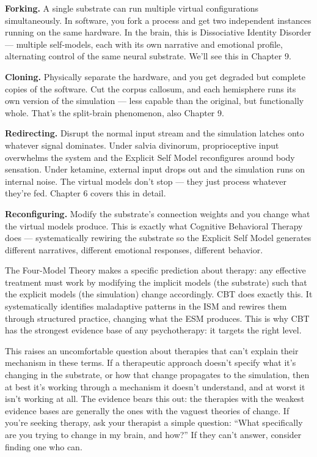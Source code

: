 \documentclass[11pt, twoside, openright]{book}
\begin{document}
\textbf{Forking.} A single substrate can run multiple virtual configurations simultaneously. In software, you fork a process and get two independent instances running on the same hardware. In the brain, this is Dissociative Identity Disorder --- multiple self-models, each with its own narrative and emotional profile, alternating control of the same neural substrate. We'll see this in Chapter 9.

\textbf{Cloning.} Physically separate the hardware, and you get degraded but complete copies of the software. Cut the corpus callosum, and each hemisphere runs its own version of the simulation --- less capable than the original, but functionally whole. That's the split-brain phenomenon, also Chapter 9.

\textbf{Redirecting.} Disrupt the normal input stream and the simulation latches onto whatever signal dominates. Under salvia divinorum, proprioceptive input overwhelms the system and the Explicit Self Model reconfigures around body sensation. Under ketamine, external input drops out and the simulation runs on internal noise. The virtual models don't stop --- they just process whatever they're fed. Chapter 6 covers this in detail.

\textbf{Reconfiguring.} Modify the substrate's connection weights and you change what the virtual models produce. This is exactly what Cognitive Behavioral Therapy does --- systematically rewiring the substrate so the Explicit Self Model generates different narratives, different emotional responses, different behavior.

The Four-Model Theory makes a specific prediction about therapy: any effective treatment must work by modifying the implicit models (the substrate) such that the explicit models (the simulation) change accordingly. CBT does exactly this. It systematically identifies maladaptive patterns in the ISM and rewires them through structured practice, changing what the ESM produces. This is why CBT has the strongest evidence base of any psychotherapy: it targets the right level.

This raises an uncomfortable question about therapies that can't explain their mechanism in these terms. If a therapeutic approach doesn't specify what it's changing in the substrate, or how that change propagates to the simulation, then at best it's working through a mechanism it doesn't understand, and at worst it isn't working at all. The evidence bears this out: the therapies with the weakest evidence bases are generally the ones with the vaguest theories of change. If you're seeking therapy, ask your therapist a simple question: ``What specifically are you trying to change in my brain, and how?'' If they can't answer, consider finding one who can.
\end{document}
